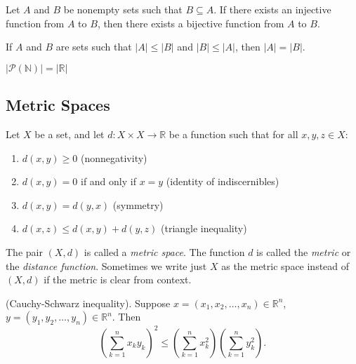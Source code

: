 \documentclass[../main.tex]{subfiles}
\begin{document}
\begin{theorem}
Let \( A \) and \( B \) be nonempty sets such that \( B \subseteq A \). If there exists an injective function from \( A \) to \( B \), then there exists a bijective function from \( A \) to \( B \).
\end{theorem}


\begin{theorem}
If \( A \) and \( B \) are sets such that \( |A| \leq |B| \) and \( |B| \leq |A| \), then \( |A| = |B| \).
\end{theorem}




\begin{theorem}
$|\mathcal{P}(\mathbb{N})| = |\mathbb{R}|$
\end{theorem}


\subsection{Metric Spaces}
\begin{definition} \label{def:metric_space}
    Let \( X \) be a set, and let \( d: X \times X \to \mathbb{R} \) be a function such that for all \( x, y, z \in X \):
    \begin{enumerate}
        \item \( d(x,y) \geq 0 \) \hfill (nonnegativity)
        \item \( d(x,y) = 0 \) if and only if \( x = y \) \hfill (identity of indiscernibles)
        \item \( d(x,y) = d(y,x) \) \hfill (symmetry)
        \item \( d(x,z) \leq d(x,y) + d(y,z) \) \hfill (triangle inequality)
    \end{enumerate}
    The pair \( (X, d) \) is called a \textit{metric space}. The function \( d \) is called the \textit{metric} or the \textit{distance function}. Sometimes we write just \( X \) as the metric space instead of \( (X, d) \) if the metric is clear from context.
    \end{definition}
    
    \begin{lemma} \label{lem:cauchy_schwarz}
    (Cauchy-Schwarz inequality). Suppose \( x = (x_1, x_2, \dots, x_n) \in \mathbb{R}^n \), \( y = (y_1, y_2, \dots, y_n) \in \mathbb{R}^n \). Then
    \[
    \left( \sum_{k=1}^{n} x_k y_k \right)^2 \leq \left( \sum_{k=1}^{n} x_k^2 \right) \left( \sum_{k=1}^{n} y_k^2 \right).
    \]
    \end{lemma}
    
\end{document}
